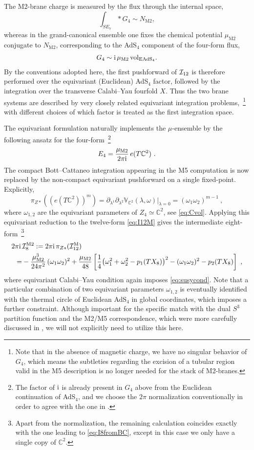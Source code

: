\documentclass[11pt,a4paper]{article}
\def\cI{{\cal I}}
\def\i{{\rm i}}
\theoremstyle{definition}
\theoremstyle{identity}
\theoremstyle{remark}
\newcommand{\be}{\begin{equation}}
\newcommand{\ee}{\end{equation}}
\newcommand{\lam}{\lambda}
\newcommand{\BV}{\mathbb{V}}
\newcommand{\BC}{\mathbb{C}}
\begin{document}
The M2-brane charge is measured by the flux through the internal space,
\be\label{M2_charge}
\int_{SE_7} *G_4\sim N_\text{M2} ,
\ee
whereas in the grand-canonical ensemble one fixes the chemical potential $\mu_\text{M2}$ conjugate to
$N_\text{M2}$, corresponding to the AdS$_4$ component of the four-form flux,
\be\label{G4_mu}
G_4 \sim \i\, \mu_\text{M2}\,{\rm vol}_{\rm EAdS_4}.
\ee
By the conventions adopted here, the first pushforward of $\cI_{12}$ is therefore performed over the equivariant (Euclidean) AdS$_4$ factor, followed by the integration over the transverse Calabi--Yau fourfold $X$. Thus the two
brane systems are described by very closely related equivariant integration problems,~\footnote{Note that in the absence of magnetic charge, we have no singular behavior of $G_4$, which means the subtleties regarding the excision of a tubular region valid in the M5 description is no longer needed for the stack of M2-branes.} with different choices
of which factor is treated as the first integration space.

The equivariant formulation naturally implements the $\mu$-ensemble by the following ansatz for the four-form~\footnote{The factor of $\i$ is already present in $G_4$ above from the Euclidean continuation of AdS$_4$, and we choose the $2 \pi$ normalization conventionally in order to agree with the one in \cite{Hristov:2026tde}.}
\be
E_4=\frac{\mu_\text{M2}}{2 \pi \i}\,e(T\BC^2)\ .
\ee
The compact Bott--Cattaneo integration appearing in the M5 computation is now replaced by the non-compact equivariant pushforward on a single fixed-point. Explicitly,
\be
\pi_{Z*}
\left((e(T\BC^2))^m\right)
= \partial_{\lam^1} \partial_{\lam^2} \BV_{\BC^2} (\lam, \omega) \Big|_{\lam = 0} =
(\omega_1\omega_2)^{m-1}\ ,
\ee
where $\omega_{1,2}$ are the equivariant parameters of $Z_4\simeq\BC^2$, see \eqref{eq:Cvol}. Applying this
equivariant reduction to the twelve-form \eqref{eq:I12M} gives the intermediate eight-form~\footnote{Apart from the normalization, the remaining calculation coincides exactly with the one leading to \eqref{eq:I8fromBC}, except in this case we only have a single copy of $\BC^2$.}
\begin{align}
\label{eq:M2braneanomaly}
\begin{split}
2\pi \i\, & \cI_8^{\rm M2}
:=
2\pi \i\, \pi_{Z*}(\cI_{12}^{\rm M})
\\
=&
-\frac{\mu_\text{M2}^3}{24 \pi^2}\,(\omega_1\omega_2)^2
+
\frac{\mu_\text{M2}}{48}
\left[
\frac14
\bigl(\omega_1^2+\omega_2^2-p_1(TX_8)\bigr)^2
-
(\omega_1\omega_2)^2
-
p_2(TX_8)
\right]\ ,
\end{split}
\end{align}
where equivariant Calabi--Yau condition again imposes \eqref{eq:susycond}. Note that a particular combination of two equivariant parameters $\omega_{1,2}$ is eventually identified with the thermal circle of Euclidean AdS$_4$ in global coordinates, which imposes a further constraint. Although important for the specific match with the dual $S^3$ partition function and the M2/M5 correspondence, which were more carefully discussed in \cite{Hristov:2026tde}, we will not explicitly need to utilize this here.
\end{document}
